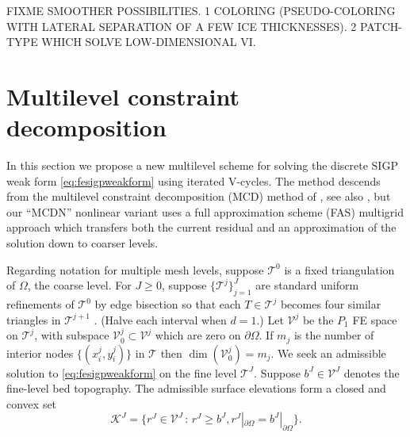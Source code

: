 \documentclass[letterpaper,final,12pt,reqno]{amsart}
\theoremstyle{claim}
\numberwithin{equation}{section}
\numberwithin{figure}{section}
\numberwithin{table}{section}
\numberwithin{theorem}{section}
\begin{document}
FIXME SMOOTHER POSSIBILITIES.  1 COLORING (PSEUDO-COLORING WITH LATERAL SEPARATION OF A FEW ICE THICKNESSES).  2 PATCH-TYPE WHICH SOLVE LOW-DIMENSIONAL VI.


\section{Multilevel constraint decomposition} \label{sec:mcdstokes}

In this section we propose a new multilevel scheme for solving the discrete SIGP weak form \eqref{eq:fesigpweakform} using iterated V-cycles.  The method descends from the multilevel constraint decomposition (MCD) method of \cite{Tai2003}, see also \cite{GraeserKornhuber2009}, but our ``MCDN'' nonlinear variant uses a full approximation scheme (FAS) multigrid \cite{Trottenbergetal2001} approach which transfers both the current residual and an approximation of the solution down to coarser levels.

Regarding notation for multiple mesh levels, suppose $\mathcal{T}^0$ is a fixed triangulation of $\Omega$, the coarse level.  For $J\ge 0$, suppose $\{\mathcal{T}^j\}_{j=1}^J$ are standard uniform refinements of $\mathcal{T}^0$ by edge bisection so that each $T \in \mathcal{T}^j$ becomes four similar triangles in $\mathcal{T}^{j+1}$ \cite{Braess2007}.  (Halve each interval when $d=1$.)  Let $\mathcal{V}^j$ be the $P_1$ FE space on $\mathcal{T}^j$, with subspace $\mathcal{V}_0^j \subset \mathcal{V}^j$ which are zero on $\partial\Omega$.  If $m_j$ is the number of interior nodes $\{(x_i^j,y_i^j)\}$ in $\mathcal{T}$ then $\dim(\mathcal{V}_0^j)=m_j$.  We seek an admissible solution to \eqref{eq:fesigpweakform} on the fine level $\mathcal{T}^J$.  Suppose $b^J \in \mathcal{V}^J$ denotes the fine-level bed topography.  The admissible surface elevations form a closed and convex set
\begin{equation}
\mathcal{K}^J = \{r^J \in \mathcal{V}^J \,:\, r^J \ge b^J, r^J|_{\partial\Omega} = b^J|_{\partial\Omega}\}.  \label{eq:singleadmissible}
\end{equation}
\end{document}
